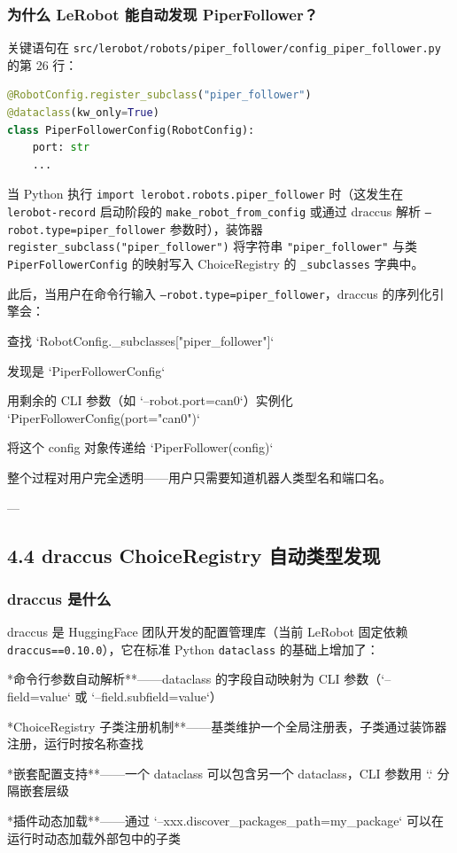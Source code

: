 \documentclass[UTF8,a4paper,11pt]{ctexart}
\begin{document}
\subsubsection{为什么 LeRobot 能自动发现 PiperFollower？}

关键语句在 \texttt{src/lerobot/robots/piper_follower/config_piper_follower.py} 的第 26 行：

\begin{lstlisting}[language=python]
@RobotConfig.register_subclass("piper_follower")
@dataclass(kw_only=True)
class PiperFollowerConfig(RobotConfig):
    port: str
    ...
\end{lstlisting}

当 Python 执行 \texttt{import lerobot.robots.piper_follower} 时（这发生在 \texttt{lerobot-record} 启动阶段的 \texttt{make_robot_from_config} 或通过 draccus 解析 \texttt{--robot.type=piper_follower} 参数时），装饰器 \texttt{register_subclass("piper_follower")} 将字符串 \texttt{"piper_follower"} 与类 \texttt{PiperFollowerConfig} 的映射写入 ChoiceRegistry 的 \texttt{_subclasses} 字典中。

此后，当用户在命令行输入 \texttt{--robot.type=piper_follower}，draccus 的序列化引擎会：

\item[1] 查找 `RobotConfig._subclasses["piper_follower"]`
\item[2] 发现是 `PiperFollowerConfig`
\item[3] 用剩余的 CLI 参数（如 `--robot.port=can0`）实例化 `PiperFollowerConfig(port="can0")`
\item[4] 将这个 config 对象传递给 `PiperFollower(config)`

整个过程对用户完全透明——用户只需要知道机器人类型名和端口名。

---

\subsection{4.4 draccus ChoiceRegistry 自动类型发现}

\subsubsection{draccus 是什么}

draccus 是 HuggingFace 团队开发的配置管理库（当前 LeRobot 固定依赖 \texttt{draccus==0.10.0}），它在标准 Python \texttt{dataclass} 的基础上增加了：

\item **命令行参数自动解析**——dataclass 的字段自动映射为 CLI 参数（`--field=value` 或 `--field.subfield=value`）
\item **ChoiceRegistry 子类注册机制**——基类维护一个全局注册表，子类通过装饰器注册，运行时按名称查找
\item **嵌套配置支持**——一个 dataclass 可以包含另一个 dataclass，CLI 参数用 `.` 分隔嵌套层级
\item **插件动态加载**——通过 `--xxx.discover_packages_path=my_package` 可以在运行时动态加载外部包中的子类
\end{document}
